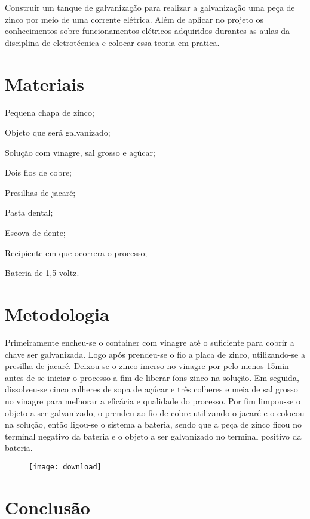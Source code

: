 \documentclass[12pt]{article}
\begin{document}
	Construir um tanque de galvanização para realizar a galvanização uma peça de zinco por meio de uma corrente elétrica. Além de aplicar no projeto os conhecimentos sobre funcionamentos elétricos adquiridos durantes as aulas da disciplina de eletrotécnica e colocar essa teoria em pratica.
	\pagebreak
	
	\section{Materiais}
	
	Pequena chapa de zinco;
	
	Objeto que será galvanizado;
	
	Solução com vinagre, sal grosso e açúcar;
	
	Dois fios de cobre;
	
	Presilhas de jacaré;
	
	Pasta dental;
	
	Escova de dente;
	
	Recipiente em que ocorrera o processo;
	
	Bateria de 1,5 voltz.
	\pagebreak
	
	\section{Metodologia}
	
	Primeiramente encheu-se o container com vinagre até o suficiente para cobrir a chave ser galvanizada. Logo após prendeu-se o fio a placa de zinco, utilizando-se a presilha de jacaré.
	Deixou-se o zinco imerso no vinagre por pelo menos 15min antes de se iniciar o processo a fim de liberar íons zinco  na solução. Em seguida, dissolveu-se cinco colheres de sopa de açúcar e três colheres e meia de sal grosso no vinagre para melhorar a eficácia e qualidade do processo.
	Por fim limpou-se o objeto a ser galvanizado, o prendeu ao fio de cobre utilizando o jacaré e o colocou na solução, então ligou-se o sistema a bateria, sendo que a peça de zinco ficou no terminal negativo da bateria e o objeto a ser galvanizado no terminal positivo da bateria.
	\begin{figure}[h]
		\centering
		\texttt{[image: download]}
		\caption{}
		\label{fig:download}
	\end{figure}
	
	\pagebreak
	
	\section{Conclusão}
	
\end{document}
